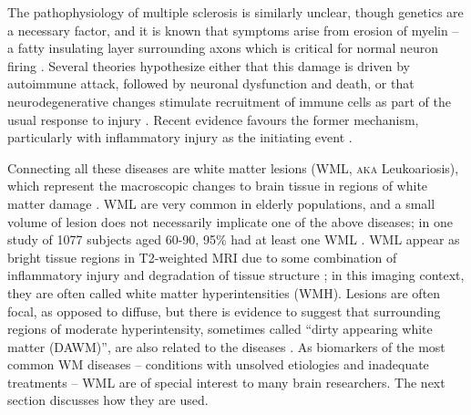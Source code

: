 \par
The pathophysiology of multiple sclerosis is similarly unclear, though genetics are a necessary factor, and it is known that symptoms arise from erosion of myelin -- a fatty insulating layer surrounding axons which is critical for normal neuron firing \cite{Trapp2008}. Several theories hypothesize either that this damage is driven by autoimmune attack, followed by neuronal dysfunction and death, or that neurodegenerative changes stimulate recruitment of immune cells as part of the usual response to injury \cite{Lucchinetti2000,Trapp2008}. Recent evidence favours the former mechanism, particularly with inflammatory injury as the initiating event \cite{Ciccarelli2014,Mahad2015}.
\par
Connecting all these diseases are white matter lesions (WML, \textsc{aka} Leukoariosis), which represent the macroscopic changes to brain tissue in regions of white matter damage \cite{Debette2010,Bakshi2005,Wardlaw2015}. WML are very common in elderly populations, and a small volume of lesion does not necessarily implicate one of the above diseases; in one study of 1077 subjects aged 60-90, 95\% had at least one WML \cite{DeLeeuw2001}. WML appear as bright tissue regions in T2-weighted MRI due to some combination of inflammatory injury and degradation of tissue structure \cite{Bakshi2005,Wardlaw2015}; in this imaging context, they are often called white matter hyperintensities (WMH). Lesions are often focal, as opposed to diffuse, but there is evidence to suggest that surrounding regions of moderate hyperintensity, sometimes called ``dirty appearing white matter (DAWM)'', are also related to the diseases \cite{Ge2003}. As biomarkers of the most common WM diseases -- conditions with unsolved etiologies and inadequate treatments -- WML are of special interest to many brain researchers. The next section discusses how they are used.
